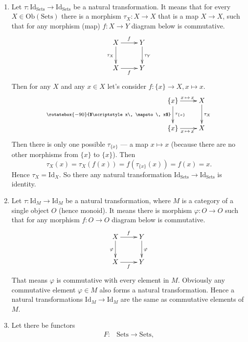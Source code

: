 \documentclass[12pt,a4paper]{article}
\newcommand{\Id}{\mathrm{Id}}
\newcommand{\Sets}{\mathrm{Sets}}
\newcommand{\Ob}{\mathrm{Ob}}
\begin{document}
    \begin{problem}{16}\ 
        \begin{enumerate}
            \renewcommand{\theenumi}{\asbuk{enumi}}
            \renewcommand{\labelenumi}{(\theenumi)}
            \item Let $\tau: \Id_\Sets \to \Id_\Sets$ be a natural transformation. It means that for every $X \in \Ob(\Sets)$ there is a morphism $\tau_X: X \to X$ that is a map $X \to X$, such that for any morphism (map) $f: X \to Y$ diagram below is commutative.
                \[
                    \xymatrix{
                        X \ar[r]^{f} \ar[d]_{\tau_X} & Y \ar[d]^{\tau_Y}\\
                        X \ar[r]_{f} & Y
                    }
                \]
                Then for any $X$ and any $x \in X$ let's consider $f: \{x\} \to X, x \mapsto x$.
                \[
                    \xymatrix{
                        \{x\} \ar[r]^{x\, \mapsto\, x} \ar[d]_{\rotatebox{-90}{$\scriptstyle x\, \mapsto\, x$}}^{\tau_{\{x\}}} & X \ar[d]^{\tau_X}\\
                        \{x\} \ar[r]_{x\, \mapsto\, x} & X
                    }
                \]
                Then there is only one possible $\tau_{\{x\}}$ --- a map $x \mapsto x$ (because there are no other morphisms from $\{x\}$ to $\{x\}$). Then
                \[\tau_X(x) = \tau_X(f(x)) = f(\tau_{\{x\}}(x)) = f(x) = x.\]
                Hence $\tau_X = \Id_X$. So there any natural transformation $\Id_{\Sets} \to \Id_{\Sets}$ is identity.
            \item Let $\tau: \Id_M \to \Id_M$ be a natural transformation, where $M$ is a category of a single object $O$ (hence monoid). It means there is morphism $\varphi: O \to O$ such that for any morphism $f: O \to O$ diagram below is commutative.
                \[
                    \xymatrix{
                        X \ar[r]^{f} \ar[d]_{\varphi} & Y \ar[d]^{\varphi}\\
                        X \ar[r]_{f} & Y
                    }
                \]
                That means $\varphi$ is commutative with every element in $M$. Obviously any commutative element $\varphi \in M$ also forms a natural transformation. Hence a natural transformations $\Id_M \to \Id_M$ are the same as commutative elements of $M$.
            \item Let there be functors
                \begin{align*}
                    F: {}
                    &\Sets \to \Sets,\\

\end{align*}
\end{enumerate}
\end{problem}
\end{document}
